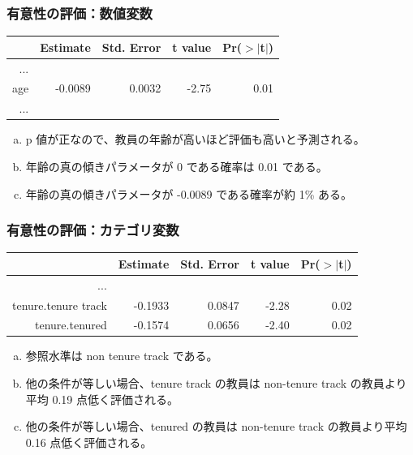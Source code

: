 
\begin{frame}
\frametitle{有意性の評価：数値変数}


{\scriptsize
\begin{center}
\begin{tabular}{rrrrr}
  \hline
 & Estimate & Std. Error & t value & Pr($>$$|$t$|$) \\
  \hline
...\\
  age & -0.0089 & 0.0032 & -2.75 & 0.01 \\
...\\
   \hline
\end{tabular}
\end{center}
}

\begin{enumerate}[(a)]
\item p 値が正なので、教員の年齢が高いほど評価も高いと予測される。
\item 年齢の真の傾きパラメータが 0 である確率は 0.01 である。
\item 年齢の真の傾きパラメータが -0.0089 である確率が約 1\% ある。
\end{enumerate}

\end{frame}


\begin{frame}[fragile]
\frametitle{有意性の評価：カテゴリ変数}


{\footnotesize
\begin{center}
\begin{tabular}{rrrrr}
  \hline
 & Estimate & Std. Error & t value & Pr($>$$|$t$|$) \\
  \hline
... \\
  tenure.tenure track & -0.1933 & 0.0847 & -2.28 & 0.02 \\
  tenure.tenured & -0.1574 & 0.0656 & -2.40 & 0.02 \\
   \hline
\end{tabular}
\end{center}
}

\begin{enumerate}[(a)]
\item 参照水準は non tenure track である。
\item 他の条件が等しい場合、tenure track の教員は non-tenure track の教員より平均 0.19 点低く評価される。
\item 他の条件が等しい場合、tenured の教員は non-tenure track の教員より平均 0.16 点低く評価される。
\end{enumerate}

\end{frame}

